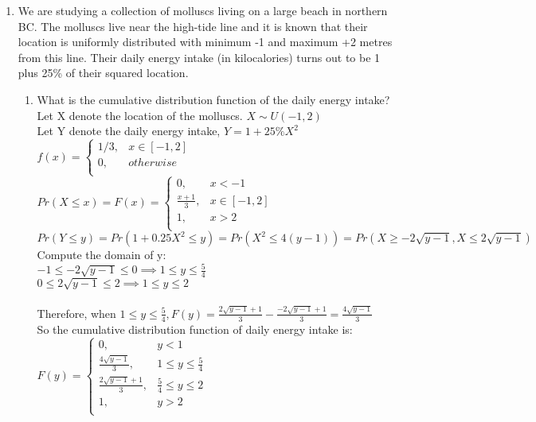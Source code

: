 \documentclass[11pt]{article}
\begin{document}
\begin{enumerate}[label=\textbf{Question \arabic*:},start=1]

\item
We are studying a collection of molluscs living on a large beach in northern BC. The molluscs live near the high-tide line and it is known that their location is uniformly distributed with minimum -1 and maximum +2 metres from this line. Their daily energy intake (in kilocalories) turns out to be 1 plus 25\% of their squared location.
\begin{enumerate}
	\item What is the cumulative distribution function of the daily energy intake?\\
	
	Let X denote the location of the molluscs. $X \sim U(-1, 2)$ \\
	Let Y denote the daily energy intake, $Y = 1 + 25\% X^2$\\
	$f(x) = \begin{cases}
		1/3, & x \in [-1, 2]\\
		0, & otherwise\\
		\end{cases}$\\
	$Pr(X \leq x) = F(x) = \begin{cases}
		0, & x < -1 \\
		\frac{x + 1}{3}, & x \in [-1, 2]\\
		1, & x > 2\\
		\end{cases}$\\
		
	$Pr(Y \leq y) = Pr(1 + 0.25 X^2 \leq y) = Pr(X^2 \leq 4(y-1)) = Pr(X \geq -2\sqrt{y-1}, X \leq 2\sqrt{y-1})$ \\
	
	Compute the domain of y:\\
	$ -1 \leq -2\sqrt{y-1} \leq 0 \implies 1 \leq y \leq \frac{5}{4} $ \\
	$ 0 \leq 2 \sqrt{y-1} \leq 2  \implies 1 \leq y \leq 2$ \\
	\\
	Therefore, when $1 \leq y \leq \frac{5}{4}, F(y) = \frac{2\sqrt{y-1}+1}{3} - \frac{-2\sqrt{y-1}+1}{3} = \frac{4\sqrt{y-1}}{3}$ \\
	So the cumulative distribution function of daily energy intake is:\\
	$F(y) = \begin{cases}
		0, & y < 1 \\
		\frac{4 \sqrt{y-1}}{3}, & 1 \leq y \le \frac{5}{4} \\
		\frac{ 2\sqrt{y-1} + 1}{3}, & \frac{5}{4} \le y \leq 2\\
		1, & y > 2 \\
		\end{cases}$\\
	

\end{enumerate}
\end{enumerate}
\end{document}
